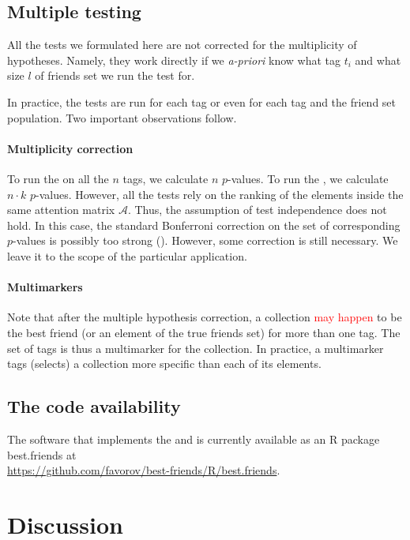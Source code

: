 \documentclass{llncs}
\begin{document}
\subsection{Multiple testing}
\label{sec:multimurkers}

All the tests we formulated here are not corrected for the multiplicity of hypotheses. Namely, they work directly if we \textit{a-priori} know what tag $t_i$ and what size $l$ of friends set we run the test for. 

In practice, the tests are run for each tag or even for each tag and the friend set population. Two important observations follow.

\paragraph*{Multiplicity correction} 
To run the  on all the $n$ tags, we 
calculate $n$ $p$-values. To run the , we calculate $n \cdot k$ $p$-values. However, all the tests rely on the ranking of the elements inside the same attention matrix $\mathcal{A}$. Thus, the assumption of test independence does not hold. In this case, the standard Bonferroni correction on the set of corresponding $p$-values is possibly too strong (\cite{cabin2000bonferroni}). However, some correction is still necessary. We leave it to the scope of the particular application.

\paragraph*{Multimarkers} Note that after the multiple hypothesis correction, a collection \textcolor{red}{may happen}
to be the best friend (or an element of the true friends set) for more than one tag. The set of tags is thus a multimarker for the collection. In practice, a multimarker tags (selects) a collection more specific than each of its elements.

\subsection{The code availability}

The software that implements the  and  is currently available as an \textsf{R} package \textsf{best.friends} at\\
\url{https://github.com/favorov/best-friends/R/best.friends}.


\section{Discussion}
\end{document}

